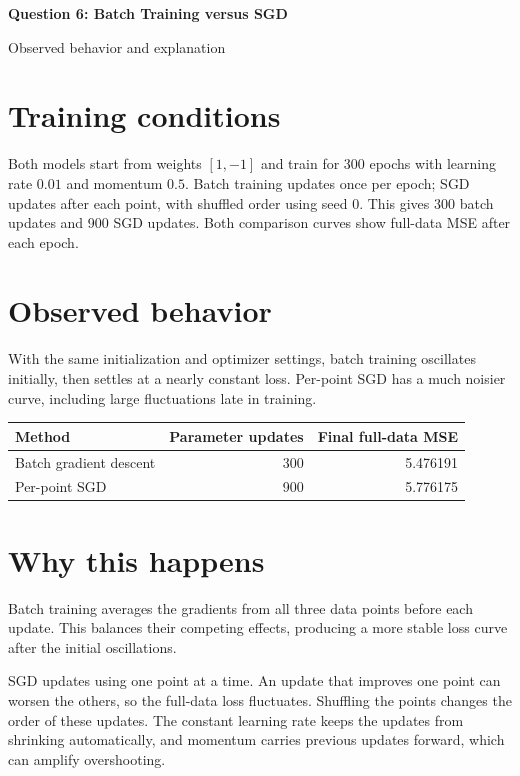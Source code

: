 \documentclass[10pt]{article}
\begin{document}
\begin{center}
{\Large\bfseries Question 6: Batch Training versus SGD}\par
Observed behavior and explanation
\end{center}

\section*{Training conditions}
Both models start from weights $[1,-1]$ and train for 300 epochs with learning
rate $0.01$ and momentum $0.5$. Batch training updates once per epoch; SGD
updates after each point, with shuffled order using seed 0. This gives 300
batch updates and 900 SGD updates. Both comparison curves show full-data MSE
after each epoch.

\section*{Observed behavior}
With the same initialization and optimizer settings, batch training oscillates
initially, then settles at a nearly constant loss. Per-point SGD has a
much noisier curve, including large fluctuations late in training.
\begin{center}
\begin{tabular}{lrr}
\toprule
Method & Parameter updates & Final full-data MSE\\
\midrule
Batch gradient descent & 300 & 5.476191\\
Per-point SGD & 900 & 5.776175\\
\bottomrule
\end{tabular}
\end{center}
\section*{Why this happens}
Batch training averages the gradients from all three data points before each
update. This balances their competing effects, producing a more stable loss
curve after the initial oscillations.

SGD updates using one point at a time. An update that improves one point can
worsen the others, so the full-data loss fluctuates. Shuffling the points changes
the order of these updates. The constant learning rate keeps the updates from
shrinking automatically, and momentum carries previous updates forward, which
can amplify overshooting.
\end{document}
